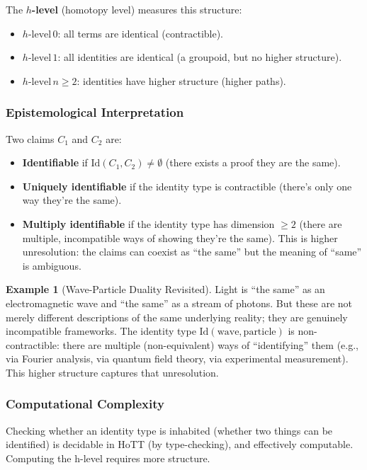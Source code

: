 \documentclass[11pt,letterpaper]{article}
\theoremstyle{definition}
\newtheorem{example}{Example}[section]
\theoremstyle{remark}
\begin{document}
The \textbf{$h$-level} (homotopy level) measures this structure:
\begin{itemize}
\item $h\text{-level} \, 0$: all terms are identical (contractible).
\item $h\text{-level} \, 1$: all identities are identical (a groupoid, but no higher structure).
\item $h\text{-level} \, n \geq 2$: identities have higher structure (higher paths).
\end{itemize}

\subsubsection*{Epistemological Interpretation}

Two claims $C_1$ and $C_2$ are:
\begin{itemize}
\item \textbf{Identifiable} if $\mathrm{Id}(C_1, C_2) \neq \emptyset$ (there exists a proof they are the same).
\item \textbf{Uniquely identifiable} if the identity type is contractible (there's only one way they're the same).
\item \textbf{Multiply identifiable} if the identity type has dimension $\geq 2$ (there are multiple, incompatible ways of showing they're the same). This is higher unresolution: the claims can coexist as ``the same'' but the meaning of ``same'' is ambiguous.
\end{itemize}

\begin{example}[Wave-Particle Duality Revisited]
Light is ``the same'' as an electromagnetic wave and ``the same'' as a stream of photons. But these are not merely different descriptions of the same underlying reality; they are genuinely incompatible frameworks. The identity type $\mathrm{Id}(\text{wave}, \text{particle})$ is non-contractible: there are multiple (non-equivalent) ways of ``identifying'' them (e.g., via Fourier analysis, via quantum field theory, via experimental measurement). This higher structure captures that unresolution.
\end{example}

\subsubsection*{Computational Complexity}

Checking whether an identity type is inhabited (whether two things can be identified) is decidable in HoTT (by type-checking), and effectively computable. Computing the h-level requires more structure.
\end{document}
